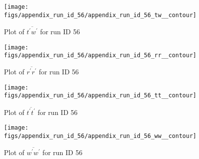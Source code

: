 \begin{figure}[H]
\centering
\texttt{[image: figs/appendix\_run\_id\_56/appendix\_run\_id\_56\_tw\_\_contour]}
\caption{Plot of $\overline{t^\prime w^\prime}$ for run ID 56}
\label{fig:appendix_run_id_56_tw__contour}
\end{figure}


\begin{figure}[H]
\centering
\texttt{[image: figs/appendix\_run\_id\_56/appendix\_run\_id\_56\_rr\_\_contour]}
\caption{Plot of $\overline{r^\prime r^\prime}$ for run ID 56}
\label{fig:appendix_run_id_56_rr__contour}
\end{figure}


\begin{figure}[H]
\centering
\texttt{[image: figs/appendix\_run\_id\_56/appendix\_run\_id\_56\_tt\_\_contour]}
\caption{Plot of $\overline{t^\prime t^\prime}$ for run ID 56}
\label{fig:appendix_run_id_56_tt__contour}
\end{figure}


\begin{figure}[H]
\centering
\texttt{[image: figs/appendix\_run\_id\_56/appendix\_run\_id\_56\_ww\_\_contour]}
\caption{Plot of $\overline{w^\prime w^\prime}$ for run ID 56}
\label{fig:appendix_run_id_56_ww__contour}
\end{figure}


